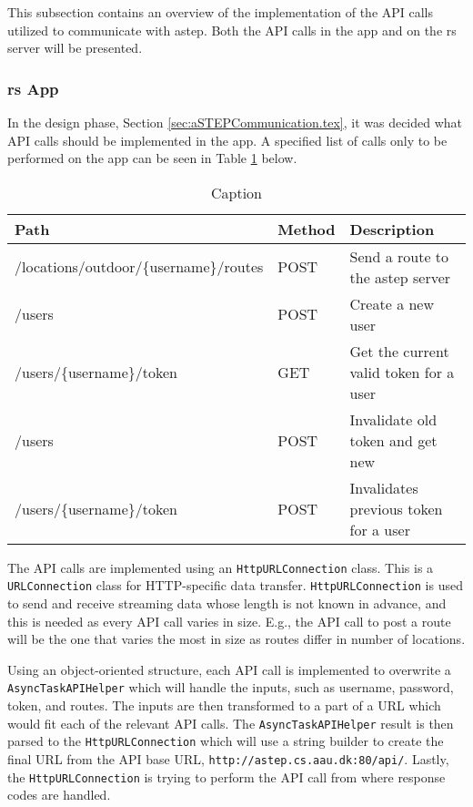 This subsection contains an overview of the implementation of the API calls utilized to communicate with \gls{astep}.
Both the API calls in the app and on the \gls{rs} server will be presented.

 \subsubsection{\gls{rs} App}
In the design phase, Section \ref{sec:aSTEPCommunication.tex}, it was decided what API calls should be implemented in the app.
A specified list of calls only to be performed on the app can be seen in Table \ref{tab:asteprequests} below.

\begin{table}[h]
	\centering
	\scriptsize
	\begin{tabular}{l l l}
		Path & Method & Description\\\midrule
		/locations/outdoor/\{username\}/routes & POST & Send a route to the \gls{astep} server\\
		/users & POST & Create a new user\\
		/users/\{username\}/token & GET & Get the current valid token for a user\\
		/users & POST & Invalidate old token and get new\\
		/users/\{username\}/token & POST & Invalidates previous token for a user\\
	\end{tabular}
	\caption{Caption}
	\label{tab:asteprequests}
\end{table} 

The API calls are implemented using an \texttt{HttpURLConnection} class.
This is a \texttt{URLConnection} class for HTTP-specific data transfer.
\texttt{HttpURLConnection} is used to send and receive streaming data whose length is not known in advance, and this is needed as every API call varies in size.
E.g., the API call to post a route will be the one that varies the most in size as routes differ in number of locations.

Using an object-oriented structure, each API call is implemented to overwrite a \texttt{AsyncTaskAPIHelper} which will handle the inputs, such as username, password, token, and routes.
The inputs are then transformed to a part of a URL which would fit each of the relevant API calls.
The \texttt{AsyncTaskAPIHelper} result is then parsed to the \texttt{HttpURLConnection} which will use a string builder to create the final URL from the API base URL, \texttt{http://astep.cs.aau.dk:80/api/}.
Lastly, the \texttt{HttpURLConnection} is trying to perform the API call from where response codes are handled.

